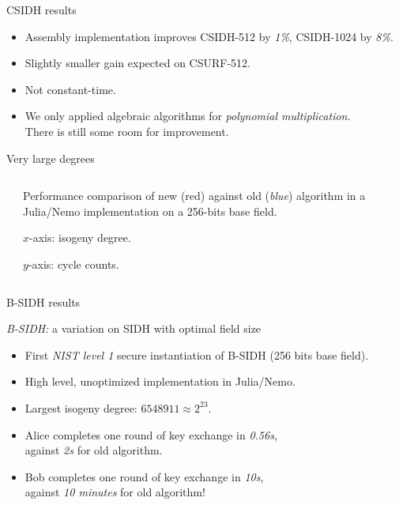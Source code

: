 \documentclass[aspectratio=169]{beamer}
\begin{document}

\begin{frame}{CSIDH results}
  \large
  \begin{itemize}
  \item Assembly implementation improves CSIDH-512 by \emph{1\%},
    CSIDH-1024 by \emph{8\%}.
  \item Slightly smaller gain expected on CSURF-512.
  \item Not constant-time.
  \item We only applied algebraic algorithms for \emph{polynomial multiplication}.\\
    \alert{There is still some room for improvement.}
  \end{itemize}
\end{frame}


\begin{frame}{Very large degrees}
  \begin{columns}
    \begin{column}{0.75\textwidth}
      \scalebox{0.9}{ }
    \end{column}
    \begin{column}{0.25\textwidth}
      Performance comparison of new (\alert{red}) against old
      (\emph{blue}) algorithm in a Julia/Nemo implementation on a
      256-bits base field.

      \medskip
      
      $x$-axis: isogeny degree.

      \medskip
      $y$-axis: cycle counts.
    \end{column}
  \end{columns}
\end{frame}


\begin{frame}{B-SIDH results}
  \large
  
  \emph{B-SIDH:} a variation on SIDH with optimal field size

  \medskip
  
  \begin{itemize}
  \item First \emph{NIST level 1} secure instantiation of B-SIDH (256 bits base field).
  \item High level, unoptimized implementation in Julia/Nemo.
  \item Largest isogeny degree: \emph{$6548911 \approx 2^{23}$}.
  \item Alice completes one round of key exchange in \emph{0.56s},\\
    against \emph{2s} for old algorithm.
  \item Bob completes one round of key exchange in \emph{10s},\\
    against \emph{10 minutes} for old algorithm!
  \end{itemize}
\end{frame}
\end{document}
